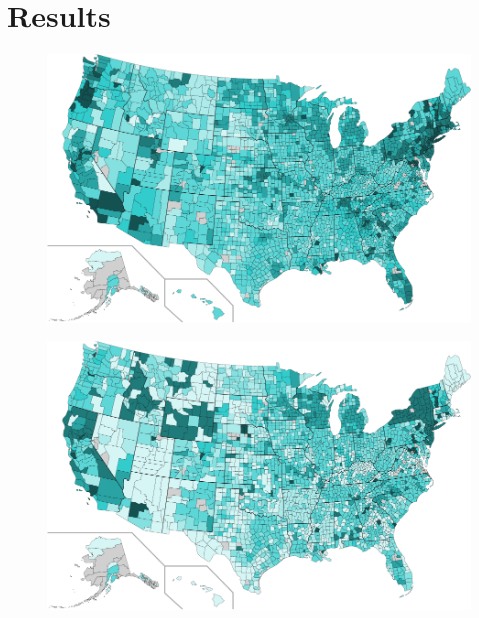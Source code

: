 \documentclass{sig-alternate-10pt}
\begin{document}
\section{Results}
\label{sec:results} 

\begin{figure}
\centering
        \includegraphics[width=0.9\linewidth]{figs/counties_maxDown.pdf}
  \caption{}
  \label{fig:services-repMaxRepDown}
\end{figure}

\begin{figure}
\centering
        \includegraphics[width=0.9\linewidth]{figs/counties_typDown.pdf}
  \caption{}
  \label{fig:services-repTypDown}
\end{figure}
\end{document}
